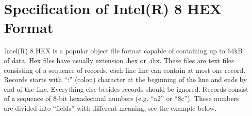     \clearpage

\section{Specification of Intel(R) 8 HEX Format}
    Intel(R) 8 HEX is a popular object file format capable of containing up to 64kB of data. Hex files have usually extension .hex or .ihx. These files are text files consisting of a sequence of records, each line line can contain at most one record. Records starts with ``:'' (colon) character at the beginning of the line and ends by end of the line. Everything else besides records should be ignored. Records consist of a sequence of 8-bit hexadecimal numbers (e.g. ``a2'' or ``8c''). These numbers are divided into ``fields'' with different meaning, see the example below.

